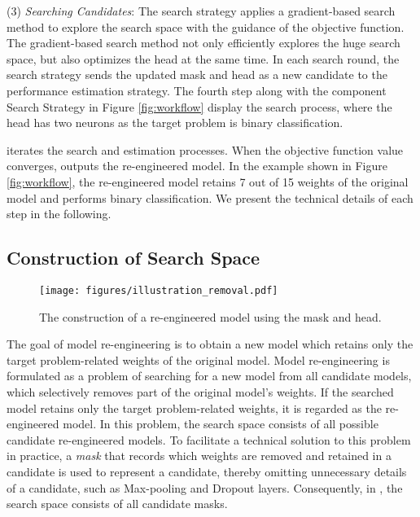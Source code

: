 (3) \textit{Searching Candidates}: The search strategy applies a gradient-based search method to explore the search space with the guidance of the objective function. The gradient-based search method not only efficiently explores the huge search space, but also optimizes the head at the same time.
In each search round, the search strategy sends the updated mask and head as a new candidate to the performance estimation strategy.
The fourth step along with the component Search Strategy in Figure \ref{fig:workflow} display the search process, where the head has two neurons as the target problem is binary classification.

\projectName iterates the search and estimation processes.
When the objective function value converges, \projectName %
outputs the re-engineered model. %
In the example shown in Figure \ref{fig:workflow}, the re-engineered model retains 7 out of 15 weights of the original model and performs binary classification.
We present the technical details of each step in the following.


\subsection{Construction of Search Space}
\begin{figure}
    \centering
    \texttt{[image: figures/illustration\_removal.pdf]}
    \caption{The construction of a re-engineered model using the mask and head. }
    \label{fig:removal}
\end{figure}

The goal of model re-engineering is to obtain a new model which retains only the target problem-related weights of the original model.
Model re-engineering is formulated as a problem of searching for a new model from all candidate models, which selectively removes part of the original model's weights. 
If the searched model retains only the target problem-related weights, it is regarded as the re-engineered model.
In this problem, the search space consists of all possible candidate re-engineered models.
To facilitate a technical solution to this problem in practice, a \textit{mask} that records which weights are removed and retained in a candidate is used to represent a candidate, thereby omitting unnecessary details of a candidate, such as Max-pooling and Dropout layers.
Consequently, in \projectName, the search space consists of all candidate masks.

